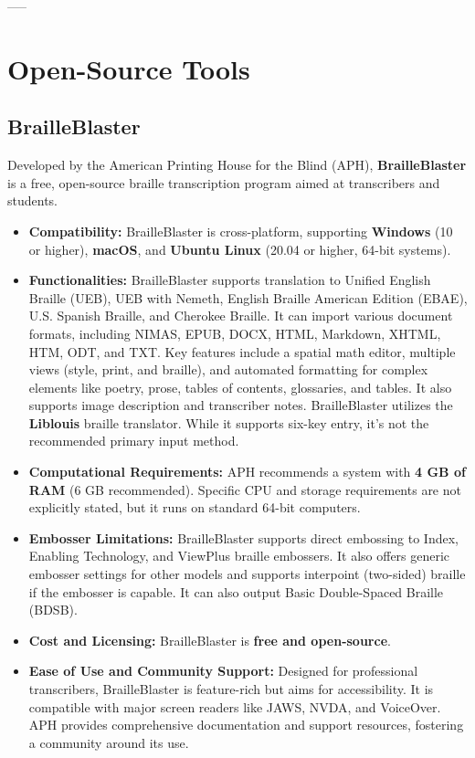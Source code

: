 -----

\section{Open-Source Tools}

\subsection{BrailleBlaster}
Developed by the American Printing House for the Blind (APH), \textbf{BrailleBlaster} is a free, open-source braille transcription program aimed at transcribers and students.

\begin{itemize}
\item \textbf{Compatibility:} BrailleBlaster is cross-platform, supporting \textbf{Windows} (10 or higher), \textbf{macOS}, and \textbf{Ubuntu Linux} (20.04 or higher, 64-bit systems)\footnotemark[7].
\item \textbf{Functionalities:} BrailleBlaster supports translation to Unified English Braille (UEB), UEB with Nemeth, English Braille American Edition (EBAE), U.S. Spanish Braille, and Cherokee Braille. It can import various document formats, including NIMAS, EPUB, DOCX, HTML, Markdown, XHTML, HTM, ODT, and TXT. Key features include a spatial math editor, multiple views (style, print, and braille), and automated formatting for complex elements like poetry, prose, tables of contents, glossaries, and tables. It also supports image description and transcriber notes. BrailleBlaster utilizes the \textbf{Liblouis} braille translator\footnotemark[7]. While it supports six-key entry, it's not the recommended primary input method.
\item \textbf{Computational Requirements:} APH recommends a system with \textbf{4 GB of RAM} (6 GB recommended). Specific CPU and storage requirements are not explicitly stated, but it runs on standard 64-bit computers.
\item \textbf{Embosser Limitations:} BrailleBlaster supports direct embossing to Index, Enabling Technology, and ViewPlus braille embossers. It also offers generic embosser settings for other models and supports interpoint (two-sided) braille if the embosser is capable\footnotemark[8]. It can also output Basic Double-Spaced Braille (BDSB).
\item \textbf{Cost and Licensing:} BrailleBlaster is \textbf{free and open-source}\footnotemark[7].
\item \textbf{Ease of Use and Community Support:} Designed for professional transcribers, BrailleBlaster is feature-rich but aims for accessibility. It is compatible with major screen readers like JAWS, NVDA, and VoiceOver. APH provides comprehensive documentation and support resources, fostering a community around its use\footnotemark[7].
\end{itemize}

